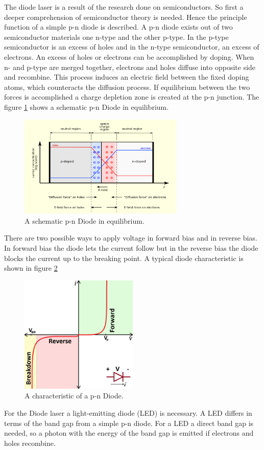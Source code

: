 The diode laser is a result of the research done on semiconductors.
So first a deeper comprehension of semiconductor theory is needed.
Hence the principle function of a simple p-n diode is described.
A p-n diode exists out of two semiconductor materials one
n-type and the other p-type.
In the p-type semiconductor is an excess of holes
and in the n-type semiconductor, an excess of electrons.
An excess of holes or electrons can be accomplished by doping.
When n- and p-type are merged together,
electrons and holes diffuse into opposite side and recombine.
This process induces an electric field between the fixed doping atoms, which
counteracts the diffusion process.
If equilibrium between the two forces is accomplished
a charge depletion zone is created
at the p-n junction.
The figure \ref{fig:equi} shows
a schematic p-n Diode in equilibrium.

\begin{figure}
\centering
\includegraphics[width=0.7\textwidth]{equilibrium.png}
\caption{A schematic p-n Diode in equilibrium.
\cite{wiki_diode}}
\label{fig:equi}
\end{figure}

There are two possible ways to apply voltage
in forward bias and
in reverse bias.
In forward bias the diode lets the current follow
but in the reverse bias the diode blocks the current up to the breaking point.
A typical diode characteristic is shown in figure \ref{fig:chara}
\begin{figure}
\centering
\includegraphics[width=0.5\textwidth]{Kennlinie.png}
\caption{A characteristic of a p-n Diode.
\cite{sparkfun}} %
\label{fig:chara}
\end{figure}
For the Diode laser a light-emitting diode (LED)
is necessary. A LED differs in terms of
the band gap
from a simple p-n diode.
For a LED a direct band gap is needed, so a photon
with the energy of the band gap is
emitted if electrons and holes recombine.

